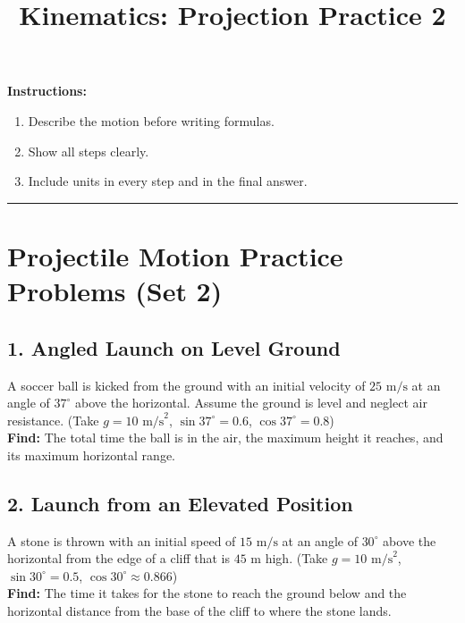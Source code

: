 \documentclass[12pt]{article}
\begin{document}
\title{Kinematics: Projection Practice 2}
\author{}
\date{}
\maketitle

\vspace{1em}

\textbf{Instructions:}

\begin{enumerate}
\item Describe the motion before writing formulas.
\item Show all steps clearly.
\item Include units in every step and in the final answer.
\end{enumerate}

\noindent\rule{\textwidth}{0.4pt}

\newpage

\section*{Projectile Motion Practice Problems (Set 2)}

\subsection*{1. Angled Launch on Level Ground}
A soccer ball is kicked from the ground with an initial velocity of $25 \text{ m/s}$ at an angle of $37^\circ$ above the horizontal. Assume the ground is level and neglect air resistance. (Take $g = 10 \text{ m/s}^2$, $\sin 37^\circ = 0.6$, $\cos 37^\circ = 0.8$) \\

\textbf{Find:} The total time the ball is in the air, the maximum height it reaches, and its maximum horizontal range.

\newpage

\subsection*{2. Launch from an Elevated Position}
A stone is thrown with an initial speed of $15 \text{ m/s}$ at an angle of $30^\circ$ above the horizontal from the edge of a cliff that is $45 \text{ m}$ high. (Take $g = 10 \text{ m/s}^2$, $\sin 30^\circ = 0.5$, $\cos 30^\circ \approx 0.866$) \\

\textbf{Find:} The time it takes for the stone to reach the ground below and the horizontal distance from the base of the cliff to where the stone lands.
\end{document}
